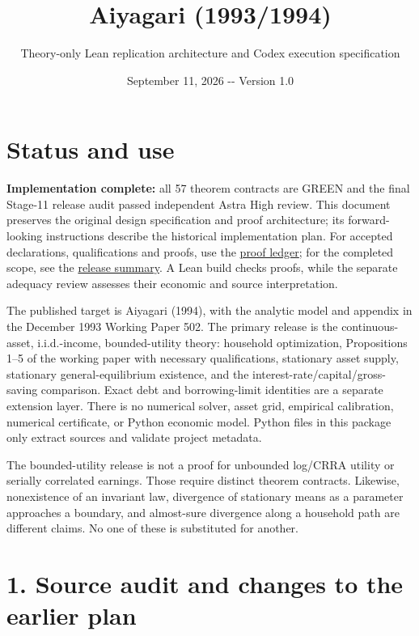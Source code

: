 \documentclass[
  11pt,
]{article}
\title{Aiyagari (1993/1994)}
\subtitle{Theory-only Lean replication architecture and Codex execution
specification}
\author{}
\date{September 11, 2026 -\/- Version 1.0}
\begin{document}
\maketitle

{
\setcounter{tocdepth}{2}
\tableofcontents
}
\section{Status and use}\label{status-and-use}

\textbf{Implementation complete:} all 57 theorem contracts are GREEN and
the final Stage-11 release audit passed independent Astra High review.
This document preserves the original design specification and proof
architecture; its forward-looking instructions describe the historical
implementation plan. For accepted declarations, qualifications and
proofs, use the \href{proof_ledger.md}{proof ledger}; for the completed
scope, see the \href{RELEASE_SUMMARY.md}{release summary}. A Lean build
checks proofs, while the separate adequacy review assesses their
economic and source interpretation.

The published target is Aiyagari (1994), with the analytic model and
appendix in the December 1993 Working Paper 502. The primary release is
the continuous-asset, i.i.d.-income, bounded-utility theory: household
optimization, Propositions 1--5 of the working paper with necessary
qualifications, stationary asset supply, stationary general-equilibrium
existence, and the interest-rate/capital/gross-saving comparison. Exact
debt and borrowing-limit identities are a separate extension layer.
There is no numerical solver, asset grid, empirical calibration,
numerical certificate, or Python economic model. Python files in this
package only extract sources and validate project metadata.

The bounded-utility release is not a proof for unbounded log/CRRA
utility or serially correlated earnings. Those require distinct theorem
contracts. Likewise, nonexistence of an invariant law, divergence of
stationary means as a parameter approaches a boundary, and almost-sure
divergence along a household path are different claims. No one of these
is substituted for another.

\section{1. Source audit and changes to the earlier
plan}\label{source-audit-and-changes-to-the-earlier-plan}
\end{document}
